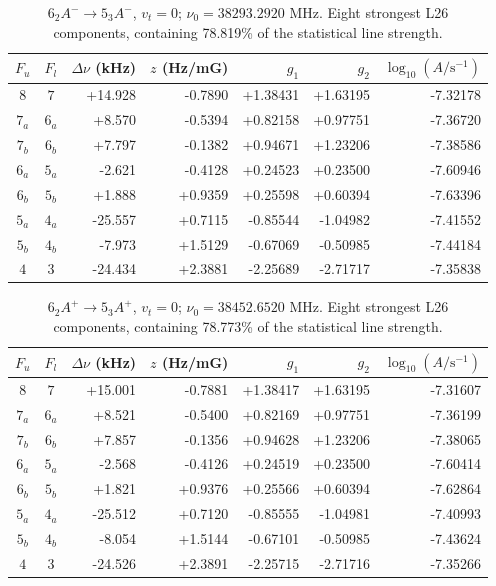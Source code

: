 \begin{table}[!htbp]
\centering\small\renewcommand{\arraystretch}{1.1}\setlength{\tabcolsep}{5pt}
\caption{$6_{2} A^{-}\rightarrow 5_{3} A^{-}$, $v_t=0$; $\nu_0=38293.2920$ MHz. Eight strongest L26 components, containing 78.819\% of the statistical line strength.}
\label{tab:sm-zeeman-38p293}
\begin{tabular}{ccrrrrr}
\hline\hline
$F_u$ & $F_l$ & $\Delta\nu$ (kHz) & $z$ (Hz/mG) & $g_1$ & $g_2$ & $\log_{10}(A/\mathrm{s}^{-1})$ \\
\hline
$8$ & $7$ & +14.928 & -0.7890 & +1.38431 & +1.63195 & -7.32178\\
$7_{a}$ & $6_{a}$ & +8.570 & -0.5394 & +0.82158 & +0.97751 & -7.36720\\
$7_{b}$ & $6_{b}$ & +7.797 & -0.1382 & +0.94671 & +1.23206 & -7.38586\\
$6_{a}$ & $5_{a}$ & -2.621 & -0.4128 & +0.24523 & +0.23500 & -7.60946\\
$6_{b}$ & $5_{b}$ & +1.888 & +0.9359 & +0.25598 & +0.60394 & -7.63396\\
$5_{a}$ & $4_{a}$ & -25.557 & +0.7115 & -0.85544 & -1.04982 & -7.41552\\
$5_{b}$ & $4_{b}$ & -7.973 & +1.5129 & -0.67069 & -0.50985 & -7.44184\\
$4$ & $3$ & -24.434 & +2.3881 & -2.25689 & -2.71717 & -7.35838\\
\hline\end{tabular}
\end{table}

\begin{table}[!htbp]
\centering\small\renewcommand{\arraystretch}{1.1}\setlength{\tabcolsep}{5pt}
\caption{$6_{2} A^{+}\rightarrow 5_{3} A^{+}$, $v_t=0$; $\nu_0=38452.6520$ MHz. Eight strongest L26 components, containing 78.773\% of the statistical line strength.}
\label{tab:sm-zeeman-38p453}
\begin{tabular}{ccrrrrr}
\hline\hline
$F_u$ & $F_l$ & $\Delta\nu$ (kHz) & $z$ (Hz/mG) & $g_1$ & $g_2$ & $\log_{10}(A/\mathrm{s}^{-1})$ \\
\hline
$8$ & $7$ & +15.001 & -0.7881 & +1.38417 & +1.63195 & -7.31607\\
$7_{a}$ & $6_{a}$ & +8.521 & -0.5400 & +0.82169 & +0.97751 & -7.36199\\
$7_{b}$ & $6_{b}$ & +7.857 & -0.1356 & +0.94628 & +1.23206 & -7.38065\\
$6_{a}$ & $5_{a}$ & -2.568 & -0.4126 & +0.24519 & +0.23500 & -7.60414\\
$6_{b}$ & $5_{b}$ & +1.821 & +0.9376 & +0.25566 & +0.60394 & -7.62864\\
$5_{a}$ & $4_{a}$ & -25.512 & +0.7120 & -0.85555 & -1.04981 & -7.40993\\
$5_{b}$ & $4_{b}$ & -8.054 & +1.5144 & -0.67101 & -0.50985 & -7.43624\\
$4$ & $3$ & -24.526 & +2.3891 & -2.25715 & -2.71716 & -7.35266\\
\hline\end{tabular}
\end{table}

